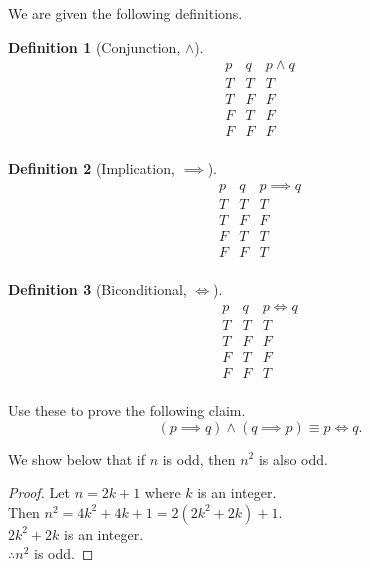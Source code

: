 \documentclass[addpoints]{exam}
\theoremstyle{definition}
\newtheorem{definition}{Definition}[section]
\theoremstyle{claim}
\begin{document}
\begin{questions}
  \question[5] We are given the following definitions.

\begin{definition}[Conjunction, $\land$]
  \[
  \begin{array}{c|c||c}
    p & q & p \land q\\
    \hline
    T & T & T \\
    T & F & F \\
    F & T & F \\
    F & F & F \\
  \end{array}
  \]
\end{definition}

\begin{definition}[Implication, $\implies$]
  \[
  \begin{array}{c|c||c}
    p & q & p \implies q\\
    \hline
    T & T & T \\
    T & F & F \\
    F & T & T \\
    F & F & T \\
  \end{array}
  \]
\end{definition}

\begin{definition}[Biconditional, $\iff$]
  \[
  \begin{array}{c|c||c}
    p & q & p \iff q\\
    \hline
    T & T & T \\
    T & F & F \\
    F & T & F \\
    F & F & T \\
  \end{array}
  \]
\end{definition}

Use these to prove the following claim.
\[
  (p\implies q) \land (q \implies p) \equiv p \iff q.
\]
  
\begin{solution}
  We show below that if $n$ is odd, then $n^2$ is also odd.
    \begin{proof}
      Let $n=2k+1$ where $k$ is an integer.\\
      Then $n^2=4k^2+4k+1 = 2 (2k^2+2k)+1$.\\
      $2k^2+2k$ is an integer.\\
      $\therefore n^2$ is odd.
    \end{proof}
  \end{solution}
\end{questions}
\end{document}
